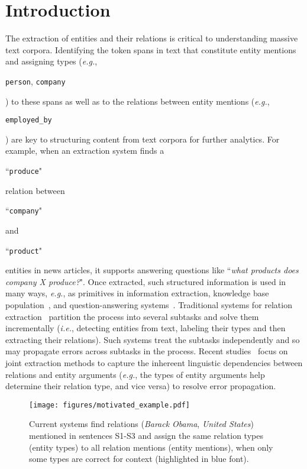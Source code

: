 \documentclass[letterpaper]{sig-alternate-2013}
\def\ie{{\sl i.e.}}
\def\eg{{\sl e.g.}}
\begin{document}
\section{Introduction}
\label{sec:intro}

The extraction of entities and their relations is critical to understanding massive text corpora. Identifying the token spans in text that constitute entity mentions and assigning types (\eg, \begin{small}\texttt{person}, \texttt{company}\end{small}) to these spans as well as to the relations between entity mentions (\eg, \begin{small}\texttt{employed\_by}\end{small}) are key to structuring content from text corpora for further analytics. 
For example, when an extraction system finds a \begin{small}``\texttt{produce}"\end{small} relation between \begin{small}``\texttt{company}"\end{small} and \begin{small}``\texttt{product}"\end{small} entities in news articles, it supports answering questions like ``\textit{what products does company X produce?}".
Once extracted, such structured information is used in many ways, \eg, as primitives in information extraction, knowledge base population~\cite{dong2014knowledge,west2014knowledge}, and question-answering systems~\cite{sun2015open,bian2008finding}.
Traditional systems for relation extraction~\cite{bach2007review,culotta2004dependency,guodong2005exploring} partition the process into several subtasks and solve them incrementally (\ie, detecting entities from text, labeling their types and then extracting their relations). Such systems treat the subtasks independently and so may propagate errors across subtasks in the process. Recent studies~\cite{li2014incremental,miwa2014modeling,roth2007global} focus on joint extraction methods to capture the inhereent linguistic dependencies between relations and entity arguments (\eg, the types of entity arguments help determine their relation type, and vice versa) to resolve error propagation.


\begin{figure}
\centering
\begin{small}
\texttt{[image: figures/motivated\_example.pdf]}
\caption{Current systems find relations (\textit{Barack Obama}, \textit{United States}) mentioned in sentences S1-S3 and assign the same relation types (entity types) to all relation mentions (entity mentions), when only some types are correct for context (highlighted in blue font).}
\label{figure:motivated_example}
\end{small}
\vspace{-0.1cm}
\end{figure}
\end{document}
